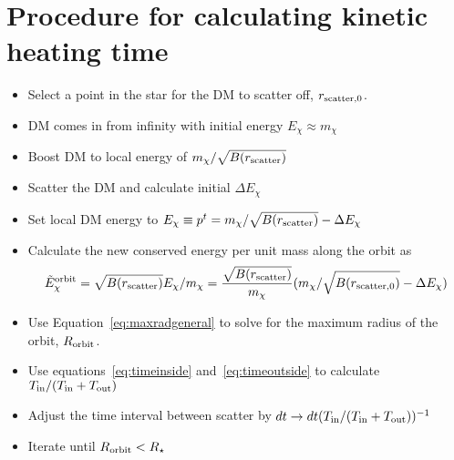 
\section{Procedure for calculating kinetic heating time}

\begin{itemize}
    \item Select a point in the star for the DM to scatter off, $r_{\rm scatter, 0}$. 
    \item DM comes in from infinity with initial energy $E_\chi \approx m_\chi$
    \item Boost DM to local energy of $m_\chi/\sqrt{B(r_{\rm scatter})}$
    \item Scatter the DM and calculate initial $\Delta E_\chi$
    \item Set local DM energy to $E_\chi \equiv p^t = m_\chi/\sqrt{B(r_{\rm scatter})} - \Delta E_\chi$
    \item Calculate the new conserved energy per unit mass along the orbit as 
    \begin{equation}
        \tilde E_\chi^{\rm orbit} = \sqrt{B(r_{\rm scatter})}E_\chi/m_\chi = \frac{\sqrt{B(r_{\rm scatter})}}{ m_\chi} (m_\chi/\sqrt{B(r_{\rm scatter, 0})} - \Delta E_\chi)
    \end{equation}
    \item Use Equation~\ref{eq:maxradgeneral} to solve for the maximum radius of the orbit, $R_{\rm orbit}$. 
    \item Use equations~\ref{eq:timeinside} and~\ref{eq:timeoutside} to calculate $T_{\rm in} / (T_{\rm in} + T_{\rm out})$
    \item Adjust the time interval between scatter by $dt\rightarrow dt (T_{\rm in} / (T_{\rm in} + T_{\rm out}))^{-1}$
    \item Iterate until $R_{\rm orbit} < R_\star$
\end{itemize}